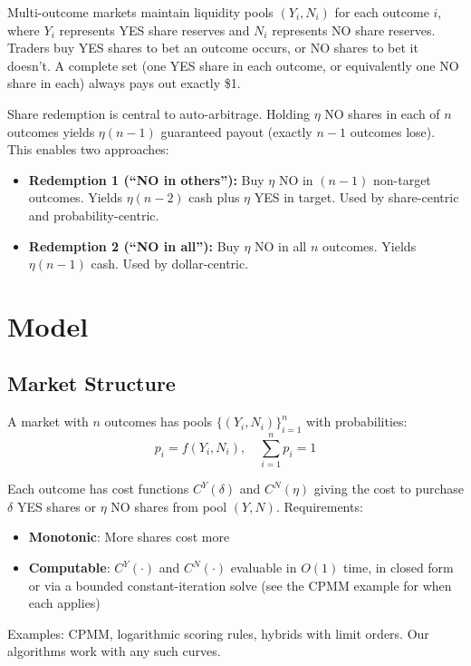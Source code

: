\documentclass[11pt]{article}
\begin{document}
Multi-outcome markets maintain liquidity pools $(Y_i, N_i)$ for each outcome $i$, where $Y_i$ represents YES share reserves and $N_i$ represents NO share reserves. Traders buy YES shares to bet an outcome occurs, or NO shares to bet it doesn't. A complete set (one YES share in each outcome, or equivalently one NO share in each) always pays out exactly \$1.

Share redemption is central to auto-arbitrage. Holding $\eta$ NO shares in each of $n$ outcomes yields $\eta(n-1)$ guaranteed payout (exactly $n-1$ outcomes lose). This enables two approaches:

\begin{itemize}
\item \textbf{Redemption 1 (``NO in others''):} Buy $\eta$ NO in $(n-1)$ non-target outcomes. Yields $\eta(n-2)$ cash plus $\eta$ YES in target. Used by share-centric and probability-centric.

\item \textbf{Redemption 2 (``NO in all''):} Buy $\eta$ NO in all $n$ outcomes. Yields $\eta(n-1)$ cash. Used by dollar-centric.
\end{itemize}

\section{Model}

\subsection{Market Structure}

A market with $n$ outcomes has pools $\{(Y_i, N_i)\}_{i=1}^n$ with probabilities:
\begin{equation}
p_i = f(Y_i, N_i), \quad \sum_{i=1}^n p_i = 1
\end{equation}

Each outcome has cost functions $C^Y(\delta)$ and $C^N(\eta)$ giving the cost to purchase $\delta$ YES shares or $\eta$ NO shares from pool $(Y, N)$. Requirements:
\begin{itemize}
\item \textbf{Monotonic}: More shares cost more
\item \textbf{Computable}: $C^Y(\cdot)$ and $C^N(\cdot)$ evaluable in $O(1)$ time, in closed form or via a bounded constant-iteration solve (see the CPMM example for when each applies)
\end{itemize}

Examples: CPMM, logarithmic scoring rules, hybrids with limit orders. Our algorithms work with any such curves.
\end{document}
